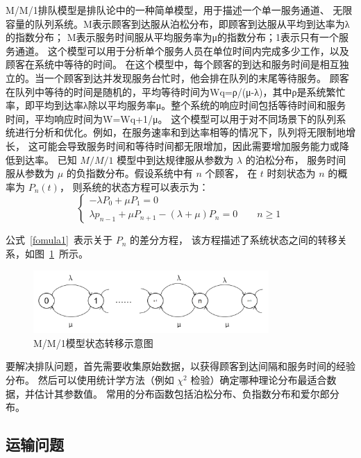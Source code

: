 M/M/1排队模型是排队论中的一种简单模型，用于描述一个单一服务通道、
无限容量的队列系统。M表示顾客到达服从泊松分布，即顾客到达服从平均到达率为λ的指数分布；
M表示服务时间服从平均服务率为μ的指数分布；1表示只有一个服务通道。
这个模型可以用于分析单个服务人员在单位时间内完成多少工作，以及顾客在系统中等待的时间。
在这个模型中，每个顾客的到达和服务时间是相互独立的。当一个顾客到达并发现服务台忙时，他会排在队列的末尾等待服务。
顾客在队列中等待的时间是随机的，平均等待时间为Wq=ρ/(μ-λ)，其中ρ是系统繁忙率，即平均到达率λ除以平均服务率μ。整个系统的响应时间包括等待时间和服务时间，平均响应时间为W=Wq+1/μ。
这个模型可以用于对不同场景下的队列系统进行分析和优化。例如，在服务速率和到达率相等的情况下，队列将无限制地增长，
这可能会导致服务时间和等待时间都无限增加，因此需要增加服务能力或降低到达率。
已知 $M/M/1$ 模型中到达规律服从参数为 $\lambda$ 的泊松分布，
服务时间服从参数为 $\mu$ 的负指数分布。假设系统中有 $n$ 个顾客，
在 $t$ 时刻状态为 $n$ 的概率为 $P_n(t)$，
则系统的状态方程可以表示为：
\begin{equation}\label{fomula1}
    \begin{cases}
        -\lambda P_0 + \mu P_1 = 0
        \\
       \lambda p_{n - 1} + \mu P_{n + 1} - (\lambda + \mu)P_n = 0 \qquad n\ge 1
       \end{cases}
\end{equation}

公式~\ref{fomula1}~表示关于 $P_n$ 的差分方程，
该方程描述了系统状态之间的转移关系，如图~\ref{fig21}~所示。

\begin{figure}[h]
\centering
\includegraphics[width=0.80\textwidth]{figs/chap02/fig21.png}
\caption{M/M/1模型状态转移示意图}
\label{fig21}
\end{figure}


要解决排队问题，首先需要收集原始数据，以获得顾客到达间隔和服务时间的经验分布。
然后可以使用统计学方法（例如 $\chi^2$ 检验）确定哪种理论分布最适合数据，并估计其参数值。
常用的分布函数包括泊松分布、负指数分布和爱尔郎分布。
\subsection{运输问题}

